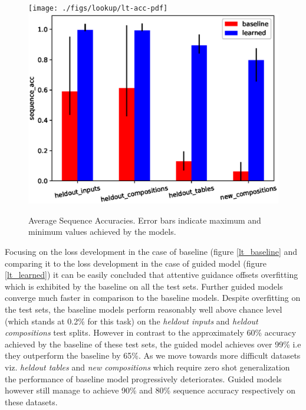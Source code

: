 \begin{figure}[H]
	\begin{minipage}[t]{0.9\textwidth}
		\centering
		\ifpdf
		\texttt{[image: ./figs/lookup/lt-acc-pdf]}
		\else
		\includegraphics[width=\linewidth,keepaspectratio=true]{./figs/lookup/lt-acc-eps}
		\fi
		\caption{\small Average Sequence Accuracies. Error bars indicate maximum and minimum values achieved by the models.}
		\label{res:lt-acc}
	\end{minipage}
\end{figure}

Focusing on the loss development in the case of baseline (figure \ref{lt_baseline} and comparing it to the loss development in the case of guided model (figure \ref{lt_learned}) it can be easily concluded that attentive guidance offsets overfitting which is exhibited by the baseline on all the test sets. Further guided models converge much faster in comparison to the baseline models. Despite overfitting on the test sets, the baseline models perform reasonably well above chance level (which stands at 0.2\% for this task) on the \textit{heldout inputs} and \textit{heldout compositions} test splits. However in contrast to the approximately 60\% accuracy achieved by the baseline of these test sets, the guided model achieves over 99\% i.e they outperform the baseline by 65\%. As we move towards more difficult datasets viz. \textit{heldout tables} and \textit{new compositions} which require zero shot generalization the performance of baseline model progressively deteriorates. Guided models however still manage to achieve 90\% and 80\% sequence accuracy respectively on these datasets. 


